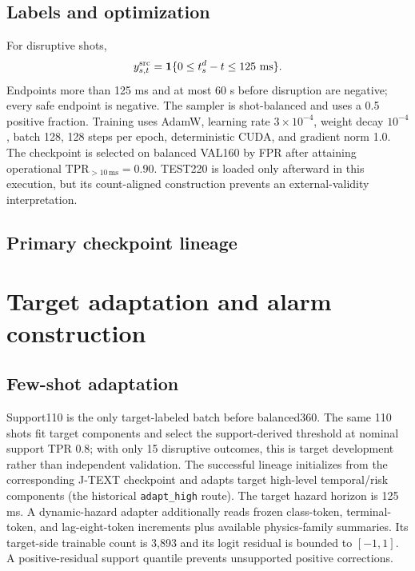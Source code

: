 \documentclass[10pt]{article}
\newcommand{\jtext}{J-TEXT}
\newcommand{\tpr}{\mathrm{TPR}}
\newcommand{\code}[1]{\nolinkurl{#1}}
\begin{document}
\subsection{Labels and optimization}

For disruptive shots,
\begin{equation}
y_{s,t}^{\rm src}=\mathbf{1}\{0\leq t_s^d-t\leq125\ \mathrm{ms}\}.
\end{equation}
Endpoints more than 125 ms and at most 60 s before disruption are negative; every safe endpoint is negative.  The sampler is shot-balanced and uses a 0.5 positive fraction.  Training uses AdamW, learning rate $3\times10^{-4}$, weight decay $10^{-4}$, batch 128, 128 steps per epoch, deterministic CUDA, and gradient norm 1.0.  The checkpoint is selected on balanced VAL160 by FPR after attaining operational $\tpr_{>10\,\mathrm{ms}}=0.90$.  TEST220 is loaded only afterward in this execution, but its count-aligned construction prevents an external-validity interpretation.

\subsection{Primary checkpoint lineage}

\begin{table}[h]
\centering

\caption{Truncated hashes for orientation; complete values reside in the machine evidence.}
\end{table}

\begin{table}[h]
\centering

\caption{Exact per-seed primary metrics recomputed from immutable per-shot predictions.}
\end{table}

\section{Target adaptation and alarm construction}

\subsection{Few-shot adaptation}

Support110 is the only target-labeled batch before balanced360.  The same 110 shots fit target components and select the support-derived threshold at nominal support TPR 0.8; with only 15 disruptive outcomes, this is target development rather than independent validation.  The successful lineage initializes from the corresponding \jtext{} checkpoint and adapts target high-level temporal/risk components (the historical \code{adapt\_high} route).  The target hazard horizon is 125 ms.  A dynamic-hazard adapter additionally reads frozen class-token, terminal-token, and lag-eight-token increments plus available physics-family summaries.  Its target-side trainable count is 3,893 and its logit residual is bounded to $[-1,1]$.  A positive-residual support quantile prevents unsupported positive corrections.
\end{document}

